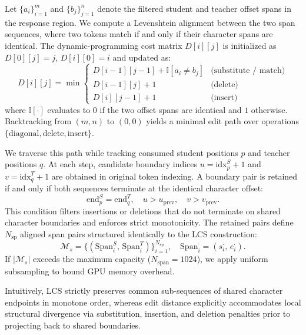 \documentclass{article} %
\theoremstyle{definition}
\theoremstyle{remark}
\begin{document}
Let $\{a_i\}_{i=1}^{m}$ and $\{b_j\}_{j=1}^{n}$ denote the filtered student and teacher offset spans in the response region. We compute a Levenshtein alignment between the two span sequences, where two tokens match if and only if their character spans are identical. The dynamic-programming cost matrix $D[i][j]$ is initialized as $D[0][j]=j$, $D[i][0]=i$ and updated as:
\begin{equation}
    D[i][j] = \min \begin{cases}
        D[i-1][j-1] + \mathbb{I}[a_i \neq b_j] & \text{(substitute / match)} \\
        D[i-1][j] + 1 & \text{(delete)} \\
        D[i][j-1] + 1 & \text{(insert)}
    \end{cases}
\end{equation}
where $\mathbb{I}[\cdot]$ evaluates to $0$ if the two offset spans are identical and $1$ otherwise. Backtracking from $(m,n)$ to $(0,0)$ yields a minimal edit path over operations $\{\mathrm{diagonal}, \mathrm{delete}, \mathrm{insert}\}$.

We traverse this path while tracking consumed student positions $p$ and teacher positions $q$. At each step, candidate boundary indices $u = \mathrm{idx}^S_{p}+1$ and $v = \mathrm{idx}^T_{q}+1$ are obtained in original token indexing. A boundary pair is retained if and only if both sequences terminate at the identical character offset:
\begin{equation}
    \mathrm{end}^S_{p} = \mathrm{end}^T_{q}, \quad u > u_{\mathrm{prev}}, \quad v > v_{\mathrm{prev}}.
\end{equation}
This condition filters insertions or deletions that do not terminate on shared character boundaries and enforces strict monotonicity. The retained pairs define $N_{\mathrm{sp}}$ aligned span pairs structured identically to the LCS construction:
\begin{equation}
    \mathcal{M}_s = \bigl\{(\mathrm{Span}^S_i,\, \mathrm{Span}^T_i)\bigr\}_{i=1}^{N_\mathrm{sp}}, \quad \mathrm{Span}^\cdot_i = (s^\cdot_i,\, e^\cdot_i).
\end{equation}
If $|\mathcal{M}_s|$ exceeds the maximum capacity ($N_{\mathrm{span}}=1024$), we apply uniform subsampling to bound GPU memory overhead.

Intuitively, LCS strictly preserves common sub-sequences of shared character endpoints in monotone order, whereas edit distance explicitly accommodates local structural divergence via substitution, insertion, and deletion penalties prior to projecting back to shared boundaries.
\end{document}
